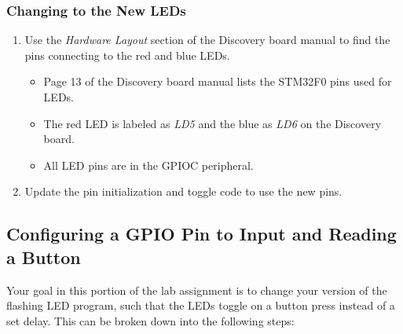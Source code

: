 \documentclass[11pt,fleqn]{book} %
\begin{document}
\subsubsection{Changing to the New LEDs}

\begin{enumerate}
    \item Use the \textit{Hardware Layout} section of the Discovery board manual to find the pins connecting to the red and blue LEDs.  
    \begin{itemize}
        \item Page 13 of the Discovery board manual lists the STM32F0 pins used for LEDs.
        \item The red LED is labeled as \textit{LD5} and the blue as \textit{LD6} on the Discovery board.
        \item All LED pins are in the GPIOC peripheral. 
    \end{itemize}
    \item Update the pin initialization and toggle code to use the new pins.
\end{enumerate}


\subsection{Configuring a GPIO Pin to Input and Reading a Button}

Your goal in this portion of the lab assignment is to change your version of the flashing LED program, such that the LEDs toggle on a button press instead of a set delay. This can be broken down into the following steps:
\end{document}
